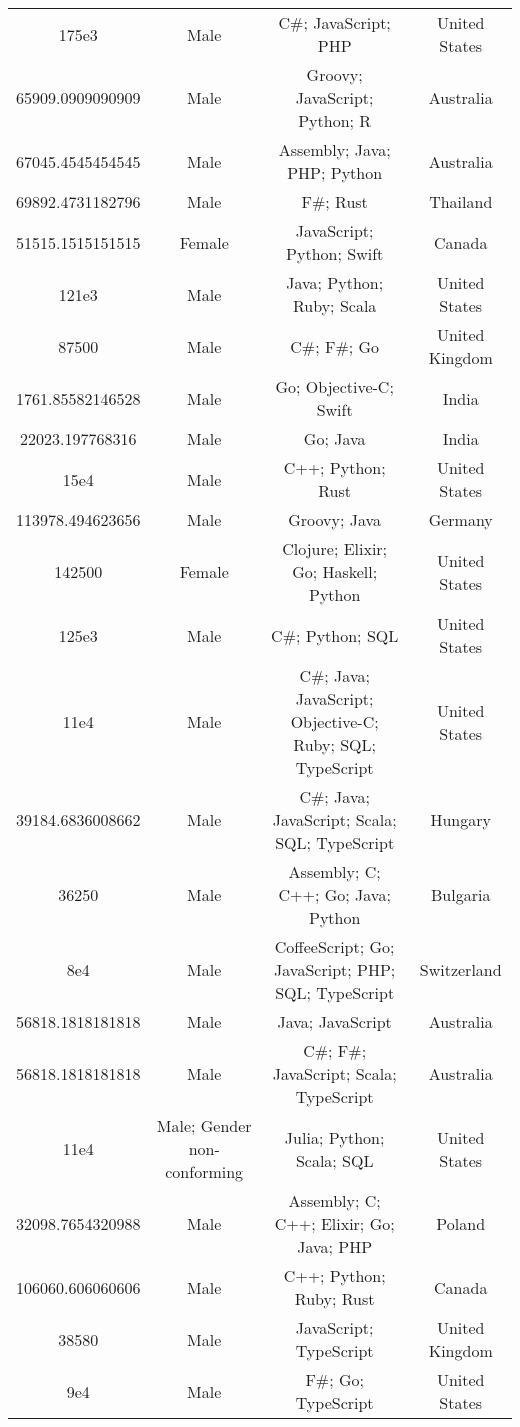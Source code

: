 \begin{center}
\begin{tabular}{ |c|c|c|c| }
175e3  &  Male  &  C\#; JavaScript; PHP  &  United States  \\ 
65909.0909090909  &  Male  &  Groovy; JavaScript; Python; R  &  Australia  \\ 
67045.4545454545  &  Male  &  Assembly; Java; PHP; Python  &  Australia  \\ 
69892.4731182796  &  Male  &  F\#; Rust  &  Thailand  \\ 
51515.1515151515  &  Female  &  JavaScript; Python; Swift  &  Canada  \\ 
121e3  &  Male  &  Java; Python; Ruby; Scala  &  United States  \\ 
87500  &  Male  &  C\#; F\#; Go  &  United Kingdom  \\ 
1761.85582146528  &  Male  &  Go; Objective-C; Swift  &  India  \\ 
22023.197768316  &  Male  &  Go; Java  &  India  \\ 
15e4  &  Male  &  C++; Python; Rust  &  United States  \\ 
113978.494623656  &  Male  &  Groovy; Java  &  Germany  \\ 
142500  &  Female  &  Clojure; Elixir; Go; Haskell; Python  &  United States  \\ 
125e3  &  Male  &  C\#; Python; SQL  &  United States  \\ 
11e4  &  Male  &  C\#; Java; JavaScript; Objective-C; Ruby; SQL; TypeScript  &  United States  \\ 
39184.6836008662  &  Male  &  C\#; Java; JavaScript; Scala; SQL; TypeScript  &  Hungary  \\ 
36250  &  Male  &  Assembly; C; C++; Go; Java; Python  &  Bulgaria  \\ 
8e4  &  Male  &  CoffeeScript; Go; JavaScript; PHP; SQL; TypeScript  &  Switzerland  \\ 
56818.1818181818  &  Male  &  Java; JavaScript  &  Australia  \\ 
56818.1818181818  &  Male  &  C\#; F\#; JavaScript; Scala; TypeScript  &  Australia  \\ 
11e4  &  Male; Gender non-conforming  &  Julia; Python; Scala; SQL  &  United States  \\ 
32098.7654320988  &  Male  &  Assembly; C; C++; Elixir; Go; Java; PHP  &  Poland  \\ 
106060.606060606  &  Male  &  C++; Python; Ruby; Rust  &  Canada  \\ 
38580  &  Male  &  JavaScript; TypeScript  &  United Kingdom  \\ 
9e4  &  Male  &  F\#; Go; TypeScript  &  United States  \\ 

\end{tabular}
\end{center}
